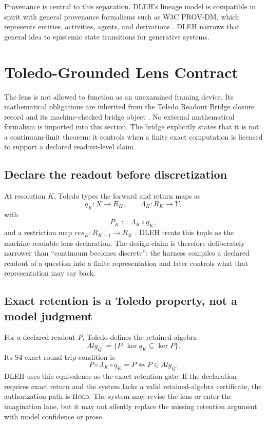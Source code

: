\documentclass[10pt,twocolumn]{article}
\begin{document}
Provenance is central to this separation. DLEH's lineage model is compatible in spirit with general provenance formalisms such as W3C PROV-DM, which represents entities, activities, agents, and derivations \cite{prov-dm}. DLEH narrows that general idea to epistemic state transitions for generative systems.

\section{Toledo-Grounded Lens Contract}
\label{sec:lens}
The lens is not allowed to function as an unexamined framing device. Its mathematical obligations are inherited from the Toledo Readout Bridge closure record and its machine-checked bridge object \cite{lahtee2026toledo}. No external mathematical formalism is imported into this section. The bridge explicitly states that it is not a continuum-limit theorem: it controls when a finite exact computation is licensed to support a declared readout-level claim.

\subsection{Declare the readout before discretization}
At resolution $K$, Toledo types the forward and return maps as
\begin{equation}
q_K : X \to R_K, \qquad \Lambda_K : R_K \to Y,
\end{equation}
with
\begin{equation}
P_K := \Lambda_K \circ q_K,
\end{equation}
and a restriction map $res_K : R_{K+1} \to R_K$ \cite{lahtee2026toledo}. DLEH treats this tuple as the machine-readable lens declaration. The design claim is therefore deliberately narrower than ``continuum becomes discrete'': the harness compiles a declared readout of a question into a finite representation and later controls what that representation may say back.

\subsection{Exact retention is a Toledo property, not a model judgment}
For a declared readout $P$, Toledo defines the retained algebra
\begin{equation}
Alg_Q := \{P : \ker q_K \subseteq \ker P\}.
\end{equation}
Its S4 exact round-trip condition is
\begin{equation}
P \circ \Lambda_K \circ q_K = P \iff P \in Alg_Q.
\end{equation}
DLEH uses this equivalence as the exact-retention gate. If the declaration requires exact return and the system lacks a valid retained-algebra certificate, the authorization path is \textsc{Hold}. The system may revise the lens or enter the imagination lane, but it may not silently replace the missing retention argument with model confidence or prose.
\end{document}
